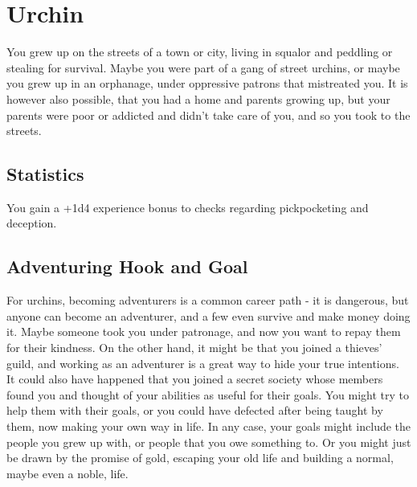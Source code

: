 \section{Urchin}\label{background:urchin}
You grew up on the streets of a town or city, living in squalor and peddling or stealing for survival.
Maybe you were part of a gang of street urchins, or maybe you grew up in an orphanage, under oppressive patrons that mistreated you.
It is however also possible, that you had a home and parents growing up, but your parents were poor or addicted and didn't take care of you, and so you took to the streets.

\subsection{Statistics}
You gain a +1d4 experience bonus to checks regarding pickpocketing and deception.

\subsection{Adventuring Hook and Goal}
For urchins, becoming adventurers is a common career path - it is dangerous, but anyone can become an adventurer, and a few even survive and make money doing it.
Maybe someone took you under patronage, and now you want to repay them for their kindness.
On the other hand, it might be that you joined a thieves' guild, and working as an adventurer is a great way to hide your true intentions.
It could also have happened that you joined a secret society whose members found you and thought of your abilities as useful for their goals.
You might try to help them with their goals, or you could have defected after being taught by them, now making your own way in life.
In any case, your goals might include the people you grew up with, or people that you owe something to.
Or you might just be drawn by the promise of gold, escaping your old life and building a normal, maybe even a noble, life.